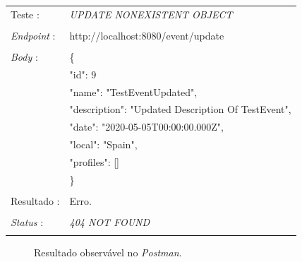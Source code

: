 \begin{tabular}{ll}
	Teste : & \emph{UPDATE NONEXISTENT OBJECT}\\
	\\
	\emph{Endpoint} : & http://localhost:8080/event/update\\
	\\
	\emph{Body} : & \{ \\
	& "id": 9 \\
	& "name": "TestEventUpdated",\\
	& "description": "Updated Description Of TestEvent",\\
	& "date": "2020-05-05T00:00:00.000Z",\\
	& "local": "Spain",\\
	& "profiles": []\\
	& \} \\
	\\
	Resultado : & Erro.\\
	\\
	\emph{Status} : & \emph{404 NOT FOUND}\\
	\\
\end{tabular}

\begin{figure}[h]
	\begin{center}
	\end{center}
	\caption{Resultado observável no \emph{Postman}.}\label{fig:eventput404}
\end{figure}
\newpage

